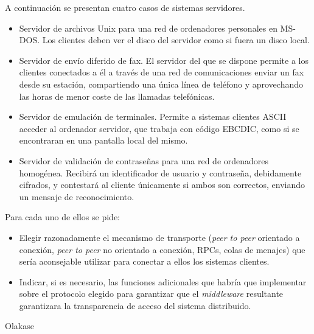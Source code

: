   \begin{problem}
  A continuación se presentan cuatro casos de sistemas servidores.
  \begin{itemize}
    \item Servidor de archivos Unix para una red de ordenadores personales en MS-DOS.
    Los clientes deben ver el disco del servidor como si fuera un disco local.
    \item Servidor de envío diferido de fax. El servidor del que se dispone permite a
los clientes conectados a él a través de una red de comunicaciones enviar un
fax desde su estación, compartiendo una única línea de teléfono y aprovechando
las horas de menor coste de las llamadas telefónicas.
    \item Servidor de emulación de terminales. Permite a sistemas clientes
ASCII acceder al ordenador servidor, que trabaja con código EBCDIC, como si se
encontraran en una pantalla local del mismo.
    \item Servidor de validación de contraseñas para una red de ordenadores
homogénea. Recibirá un identificador de usuario y contraseña, debidamente
cifrados, y contestará al cliente únicamente si ambos son correctos, enviando un mensaje de reconocimiento.
  \end{itemize}
  Para cada uno de ellos se pide:
  \begin{itemize}
    \item Elegir razonadamente el mecanismo de transporte (\textit{peer to peer} orientado a conexión, \textit{peer to peer }no orientado a conexión, RPCs, colas de menajes) que sería aconsejable utilizar para conectar a ellos los sistemas clientes.
    \item Indicar, si es necesario, las funciones adicionales que 
habría que implementar sobre el protocolo elegido para garantizar que el
 \textit{middleware }resultante garantizara la transparencia de acceso del sistema distribuido.
  \end{itemize}
    \solution

    Olakase

    \end{problem}


